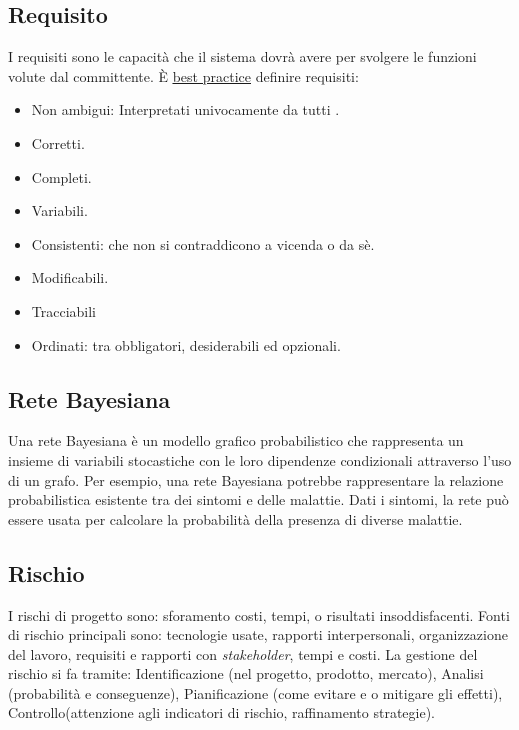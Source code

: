 	\subsection{Requisito}
	\label{sec:requisito}
	I requisiti sono le capacità che il sistema dovrà avere per svolgere le funzioni volute dal committente. È \underline{\hyperref[sec:bestpractice]{best practice}} definire requisiti:
	\begin{itemize}  
	\item Non ambigui: Interpretati univocamente da tutti .
	\item Corretti.
	\item Completi.
	\item Variabili.
	\item Consistenti: che non si contraddicono a vicenda o da sè.
	\item Modificabili.
	\item Tracciabili
	\item Ordinati: tra obbligatori, desiderabili ed opzionali. 
	\end{itemize}

	\subsection{Rete Bayesiana}
	\label{sec:retebayes}
	Una rete Bayesiana è un modello grafico probabilistico che rappresenta un insieme di variabili stocastiche con le loro dipendenze condizionali attraverso l'uso di un grafo. Per esempio, una rete Bayesiana potrebbe rappresentare la relazione probabilistica esistente tra dei sintomi e delle malattie. Dati i sintomi, la rete può essere usata per calcolare la probabilità della presenza di diverse malattie.

	\subsection{Rischio}
	\label{sec:rischio}
	I rischi di progetto sono: sforamento costi, tempi, o risultati insoddisfacenti. Fonti di rischio principali sono:
	tecnologie usate, rapporti interpersonali, organizzazione del lavoro, requisiti e rapporti con  \emph{stakeholder}, tempi e costi.
	La gestione del rischio si fa tramite:
	Identificazione (nel progetto, prodotto, mercato), Analisi (probabilità e conseguenze), Pianificazione (come evitare e o mitigare gli effetti), Controllo(attenzione agli indicatori di rischio, raffinamento strategie).
	
